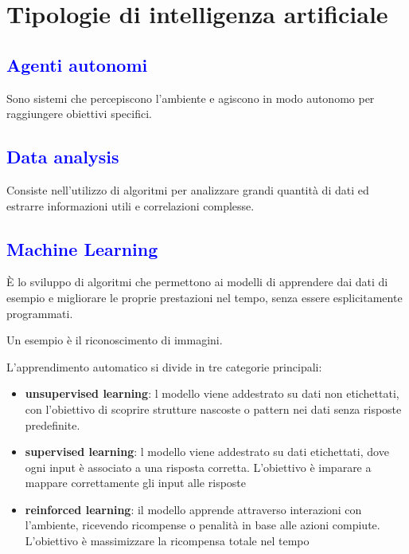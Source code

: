 \documentclass[a4paper, 12pt]{book}
\begin{document}
    \section*{Tipologie di intelligenza artificiale}

    \subsection*{\textcolor{blue}{Agenti autonomi}}
    Sono sistemi che percepiscono l’ambiente e agiscono in modo autonomo per raggiungere obiettivi specifici.

    \subsection*{\textcolor{blue}{Data analysis}}
    Consiste nell’utilizzo di algoritmi per analizzare grandi quantità di dati ed estrarre informazioni utili e correlazioni complesse.

    \subsection*{\textcolor{blue}{Machine Learning}}
    È lo sviluppo di algoritmi che permettono ai modelli di apprendere dai dati di esempio e migliorare le proprie prestazioni nel tempo, senza essere esplicitamente programmati.
    
    Un esempio è il riconoscimento di immagini.

    L’apprendimento automatico si divide in tre categorie principali:
    \begin{itemize}
      \item \textbf{unsupervised learning}: l modello viene addestrato su dati non etichettati, con l’obiettivo di scoprire strutture nascoste o pattern nei dati senza risposte predefinite.
    \item \textbf{supervised learning}: l modello viene addestrato su dati etichettati, dove ogni input è associato a una risposta corretta. L’obiettivo è imparare a mappare correttamente gli input alle risposte
      \item \textbf{reinforced learning}: il modello apprende attraverso interazioni con l’ambiente, ricevendo ricompense o penalità in base alle azioni compiute. L’obiettivo è massimizzare la ricompensa totale nel tempo
    \end{itemize}
\end{document}

